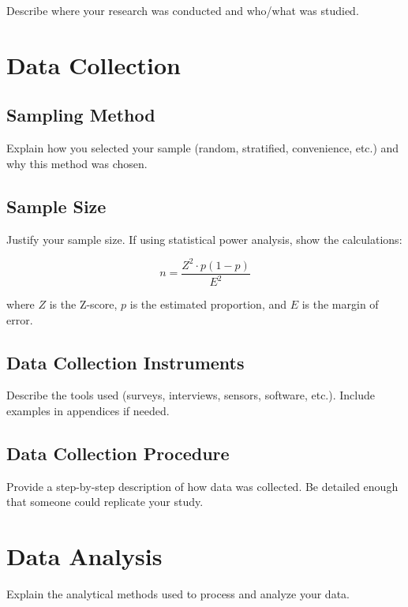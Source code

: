 \documentclass[12pt, a4paper]{report}
\begin{document}
	Describe where your research was conducted and who/what was studied.
	
	\section{Data Collection}
	\label{sec:data_collection}
	
	\subsection{Sampling Method}
	
	Explain how you selected your sample (random, stratified, convenience, etc.) and why this method was chosen.
	
	\subsection{Sample Size}
	
	Justify your sample size. If using statistical power analysis, show the calculations:
	
	\begin{equation}
		n = \frac{Z^2 \cdot p(1-p)}{E^2}
		\label{eq:sample_size}
	\end{equation}
	
	where $Z$ is the Z-score, $p$ is the estimated proportion, and $E$ is the margin of error.
	
	\subsection{Data Collection Instruments}
	
	Describe the tools used (surveys, interviews, sensors, software, etc.). Include examples in appendices if needed.
	
	\subsection{Data Collection Procedure}
	
	Provide a step-by-step description of how data was collected. Be detailed enough that someone could replicate your study.
	
	\section{Data Analysis}
	\label{sec:analysis}
	
	Explain the analytical methods used to process and analyze your data.
	
\end{document}

